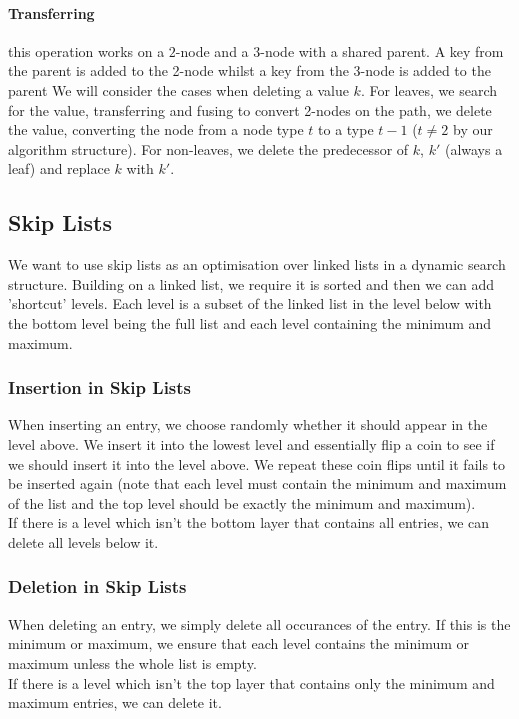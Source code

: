 \paragraph{Transferring} this operation works on a $2$-node and a $3$-node with a shared parent.
A key from the parent is added to the 2-node whilst a key from the 3-node is added to the parent
\newpage
We will consider the cases when deleting a value $k$. For leaves, we search for the value,
transferring and fusing to convert 2-nodes on the path, we delete the value, converting the
node from a node type $t$ to a type $t - 1$ ($t \neq 2$ by our algorithm structure). For
non-leaves, we delete the predecessor of $k$, $k'$ (always a leaf) and replace $k$ with $k'$.

\subsection{Skip Lists}

We want to use skip lists as an optimisation over linked lists in a
dynamic search structure. Building on a linked list, we require it is sorted and then 
we can add 'shortcut' levels. Each level is a subset of the linked list in 
the level below with the bottom level being the full list and each level containing
the minimum and maximum.

\subsubsection{Insertion in Skip Lists}

When inserting an entry, we choose randomly whether it should appear in the level above.
We insert it into the lowest level and essentially flip a coin to see if we should insert it 
into the level above. We repeat these coin flips until it fails to be inserted again
(note that each level must contain the minimum and maximum of the list and the top
level should be exactly the minimum and maximum).
\\[\baselineskip]
If there is a level which isn't the bottom layer that contains all entries, we can
delete all levels below it.

\subsubsection{Deletion in Skip Lists}

When deleting an entry, we simply delete all occurances of the entry. If this is the minimum
or maximum, we ensure that each level contains the minimum or maximum unless the
whole list is empty.
\\[\baselineskip]
If there is a level which isn't the top layer that contains only the minimum and maximum 
entries, we can delete it.

